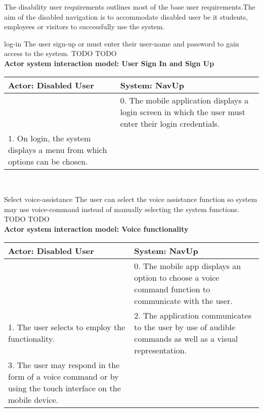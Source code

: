 The disability user requirements outlines most of the base user requirements.The aim of the disabled navigation is to accommodate disabled user be it students, employees or visitors to successfully use the system.

\FuncReq 
{log-in }
{The user sign-up or must enter their user-name and password to gain access to the system. }
 {TODO}
 {TODO}
     \\
    \textbf{Actor system interaction model: User Sign In and Sign Up }\\
    \begin{tabular}{ | p{6cm} | p{6cm} |}
    \hline
    Actor: Disabled User & System: NavUp \\ \hline
     & 0. The mobile application displays a login screen in which the user must enter their login credentials.\\ \hline
    1. On login, the system displays a menu from which options can be chosen. &\\ \hline   
    \end{tabular}
\\
\bigskip

\FuncReq
{Select voice-assistance }
{The user can select the voice assistance function so system may use voice-command instead of manually selecting the system functions.}
{TODO}
{TODO}
    \\
    \textbf{Actor system interaction model: Voice functionality }\\
    \begin{tabular}{ | p{6cm} | p{6cm} |}
    \hline
    Actor: Disabled User & System: NavUp \\ \hline
     & 0. The mobile app displays an option to choose a voice command function to communicate with the user.\\ \hline
    1. The user selects to employ the functionality. & 2. The application communicates to the user by use of audible commands as well as a visual representation.\\ \hline
    3. The user may respond in the form of a voice command or by using the touch interface on the mobile device. & \\ \hline
    
    \end{tabular}
\\
\bigskip

